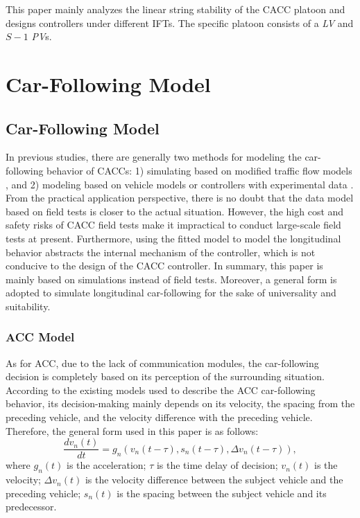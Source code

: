 \documentclass[journal]{IEEEtran}
\begin{document}
This paper mainly analyzes the linear string stability of the CACC platoon and designs controllers under different IFTs. The specific platoon consists of a \emph{LV} and $S-1$ \emph{PV}s.

\section{Car-Following Model}
\label{Section 3}
\subsection{Car-Following Model}

In previous studies, there are generally two methods for modeling the car-following behavior of CACCs: 1) simulating based on modified traffic flow models \citep{farah2014cooperative,yu2015effects,li2015stability}, and 2) modeling based on vehicle models or controllers with experimental data \citep{fernandes2014multiplatooning,milanes2014modeling,milanes2013cooperative}. From the practical application perspective, there is no doubt that the data model based on field tests is closer to the actual situation. However, the high cost and safety risks of CACC field tests make it impractical to conduct large-scale field tests at present. Furthermore, using the fitted model to model the longitudinal behavior abstracts the internal mechanism of the controller, which is not conducive to the design of the CACC controller. In summary, this paper is mainly based on simulations instead of field tests. Moreover, a general form is adopted to simulate longitudinal car-following for the sake of universality and suitability.

\subsubsection{ACC Model}
As for ACC, due to the lack of communication modules, the car-following decision is completely based on its perception of the surrounding situation. According to the existing models used to describe the ACC car-following behavior, its decision-making mainly depends on its velocity, the spacing from the preceding vehicle, and the velocity difference with the preceding vehicle. Therefore, the general form used in this paper is as follows:
\begin{equation}
  \frac{d v_{n}(t)}{d t}=g_{n}\left(v_{n}(t-\tau), s_{n}(t-\tau), \Delta v_{n}(t-\tau)\right),
  \label{Eq1}
\end{equation}
where $g_n (t)$ is the acceleration; $\tau$ is the time delay of decision; $v_n (t)$ is the velocity; $\Delta v_n (t)$ is the velocity difference between the subject vehicle and the preceding vehicle; $s_n (t)$ is the spacing between the subject vehicle and its predecessor.
\end{document}

